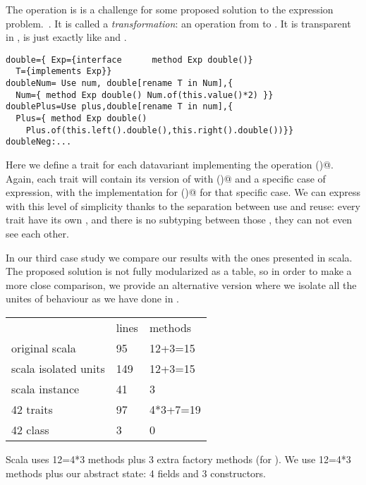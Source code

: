 The operation \Q@double@ is is a challenge for some proposed solution to the expression problem.~\cite{}.
It is called a \emph{transformation}: an operation from \Q@Exp@ to \Q@Exp@.
It is transparent in \name, is just exactly like \Q@eval@ and \Q@show@.
\begin{lstlisting}
double={ Exp={interface      method Exp double()}
  T={implements Exp}}
doubleNum= Use num, double[rename T in Num],{
  Num={ method Exp double() Num.of(this.value()*2) }}
doublePlus=Use plus,double[rename T in num],{
  Plus={ method Exp double()
    Plus.of(this.left().double(),this.right().double())}}
doubleNeg:...
\end{lstlisting}
Here we define a trait for each datavariant implementing the operation \Q@double()@.
Again, each trait will contain its version of \Q@Exp@ with \Q@double()@
and a specific case of expression, with the implementation for \Q@double()@
for that specific case.
We can express \Q@double@ with this level of simplicity
thanks to the separation between use and reuse:
every trait have its own \Q@Exp@,
and there is no subtyping between those \Q@Exp@, they can not even
see each other.

In our third case study we compare our results with the ones presented
in scala.~\cite{}
The proposed solution is not fully modularized as a table,
so in order to make a more close comparison, we provide an alternative
version where we isolate all the unites of behaviour as we
have done in \name.
\begin{minipage}{0.4\textwidth}
\begin{tabular}{l |l |l}
&                              lines  &   methods\\
original scala            & 95     &  12+3=15\\
scala  isolated units   & 149    &  12+3=15\\
scala  instance         &   41   &     3\\
42 traits               &   97   &    4*3+7=19\\
42 class                &   3    &     0\\
\end{tabular}
\end{minipage}
\begin{minipage}{0.6\textwidth}
Scala uses 12=4*3 methods plus 3 extra factory methods (for \Q@double@).
We use 12=4*3 methods plus our abstract state: 4 fields and 3 constructors.

\end{minipage}

